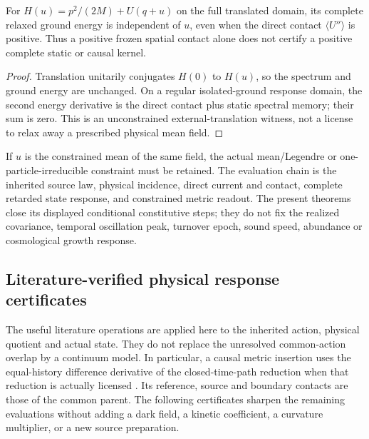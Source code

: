 \documentclass[12pt,a4paper]{article}
\begin{document}
\begin{proposition}
\label{p8:prop:v2209-state-rar-relaxation-witness}
For $H(u)=p^2/(2M)+U(q+u)$ on the full translated domain, its complete
relaxed ground energy is independent of $u$, even when the direct contact
$\langle U''\rangle$ is positive. Thus a positive frozen spatial contact
alone does not certify a positive complete static or causal kernel.
\end{proposition}
\begin{proof}
Translation unitarily conjugates $H(0)$ to $H(u)$, so the spectrum and
ground energy are unchanged. On a regular isolated-ground response domain,
the second energy derivative is the direct contact plus static spectral
memory; their sum is zero. This is an unconstrained external-translation
witness, not a license to relax away a prescribed physical mean field.
\end{proof}

If $u$ is the constrained mean of the same field, the actual mean/Legendre
or one-particle-irreducible constraint must be retained. The evaluation
chain is the inherited source law, physical incidence, direct current
and contact, complete retarded state response, and constrained metric
readout. The present theorems close its displayed conditional constitutive
steps; they do not fix the realized covariance, temporal oscillation peak,
turnover epoch, sound speed, abundance or cosmological growth response.


\subsection{Literature-verified physical response certificates}
\label{p8:sec:v2210-lit-response-certificates}

The useful literature operations are applied here to the inherited action,
physical quotient and actual state. They do not replace the unresolved
common-action overlap by a continuum model. In particular, a causal
metric insertion uses the equal-history difference derivative of the
closed-time-path reduction when that reduction is actually licensed
\cite{LitCOSCalzettaHu1987}. Its reference, source and boundary contacts
are those of the common parent. The following certificates sharpen the
remaining evaluations without adding a dark field, a kinetic coefficient,
a curvature multiplier, or a new source preparation.
\end{document}

